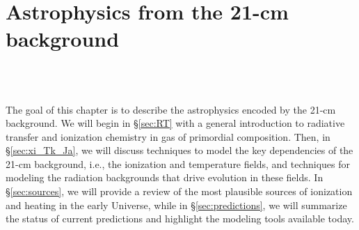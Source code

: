

\chapter{Astrophysics from the 21-cm background}

\begin{bf}
  \author{Jordan Mirocha}\\
\\
\end{bf}

The goal of this chapter is to describe the astrophysics encoded by the 21-cm background. We will begin in \S\ref{sec:RT} with a general introduction to radiative transfer and ionization chemistry in gas of primordial composition. Then, in \S\ref{sec:xi_Tk_Ja}, we will discuss techniques to model the key dependencies of the 21-cm background, i.e., the ionization and temperature fields, and techniques for modeling the radiation backgrounds that drive evolution in these fields. In \S\ref{sec:sources}, we will provide a review of the most plausible sources of ionization and heating in the early Universe, while in \S\ref{sec:predictions}, we will summarize the status of current predictions and highlight the modeling tools available today.



%
%


